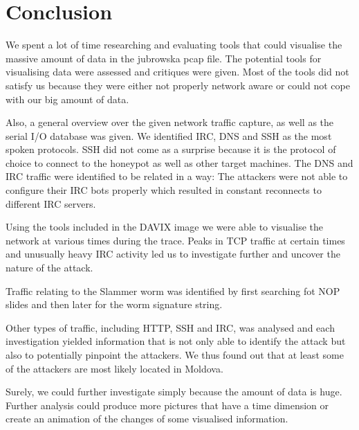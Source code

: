 \documentclass[a4paper,
    11pt,
    normalheadings,
    parindent,
    UKenglish,
    abstracton,
    ]{scrartcl}
\begin{document}
\section{Conclusion} \label{sec:conclusion}

We spent a lot of time researching and evaluating tools that could visualise the massive amount of data in the jubrowska pcap file.
The potential tools for visualising data were assessed and critiques were given.
Most of the tools did not satisfy us because they were either not properly network aware or could not cope with our big amount of data.

Also, a general overview over the given network traffic capture, as well as the serial I/O database was given.
We identified IRC, DNS and SSH as the most spoken protocols.
SSH did not come as a surprise because it is the protocol of choice to connect to the honeypot as well as other target machines.
The DNS and IRC traffic were identified to be related in a way: The attackers were not able to configure their IRC bots properly which resulted in constant reconnects to different IRC servers.


Using the tools included in the DAVIX image we were able to visualise the network at various times during the trace. Peaks in TCP traffic at certain times and unusually heavy IRC activity led us to investigate further and uncover the nature of the attack.

Traffic relating to the Slammer worm was identified by first searching fot NOP slides and then later for the worm signature string.

Other types of traffic, including HTTP, SSH and IRC, was analysed and each investigation yielded information that is not only able to identify the attack but also to potentially pinpoint the attackers.
We thus found out that at least some of the attackers are most likely located in Moldova.

Surely, we could further investigate simply because the amount of data is huge.
Further analysis could produce more pictures that have a time dimension or create an animation of the changes of some visualised information.

% 
% 
% 
%
%
\end{document}
